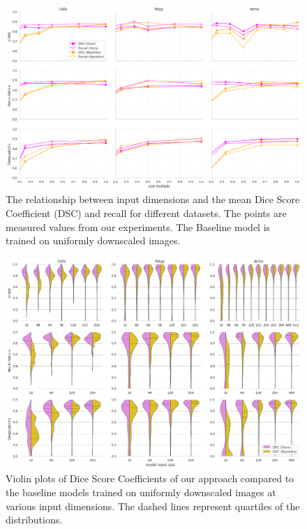 \begin{figure}[t!]
\centering
\includegraphics[width=\textwidth]{images/5/dsc-vs-size.png}
\caption{The relationship between input dimensions and the mean Dice Score Coefficient (DSC) and recall for different datasets. The points are measured values from our experiments. The Baseline model is trained on uniformly downscaled images.\label{fig:dsc-vs-size}}
\end{figure}

\begin{figure}[b!]
\centering
\includegraphics[width=\textwidth]{images/5/violin-plots.png}
\caption{Violin plots of Dice Score Coefficients of our approach compared to the baseline models trained on uniformly downscaled images at various input dimensions. The dashed lines represent quartiles of the distributions.\label{fig:box-plots}}
\end{figure}

